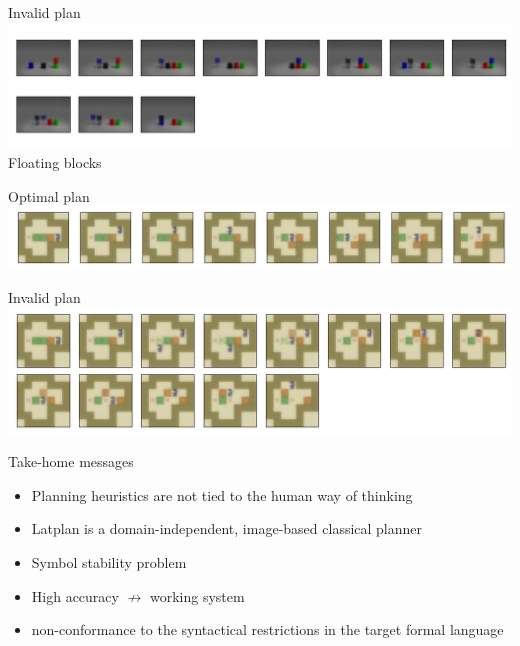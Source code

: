\documentclass{lecture}
\begin{document}
\begin{frame}{Invalid plan}
    \includegraphics[width=\textwidth]{img___static___examples___007-001-ama3_samples_blocks_cylinders-4-flat_20000_None_None_CubeSpaceAE_AMA4Conv_kltune2_logs_05-06T11-21-56-235_domain_lama_problem_False-1.png}
    \vfill
    Floating blocks
    \vfill
\end{frame}

\begin{frame}{Optimal plan}
\includegraphics[width=\textwidth]{img___static___examples___007-000-_AMA3Conv_kltune2_logs_05-09T16-42-28-299_domain_blind_problem_False-1.png}
\end{frame}

\begin{frame}{Invalid plan}
\includegraphics[width=\textwidth]{img___static___examples___014-019-_AMA4Conv_nozsae2_logs_05-15T21-58-49-878_domain_mands_problem_False-1.png} 
\end{frame}

\begin{frame}{Take-home messages}
    \begin{itemize}
        \item Planning heuristics are not tied to the human way of thinking
        \item Latplan is a domain-independent, image-based classical planner
        \item Symbol stability problem
        \item High accuracy $\not\to$ working system
        \item non-conformance to the syntactical restrictions in the target formal language
    \end{itemize}
\end{frame}
\end{document}
